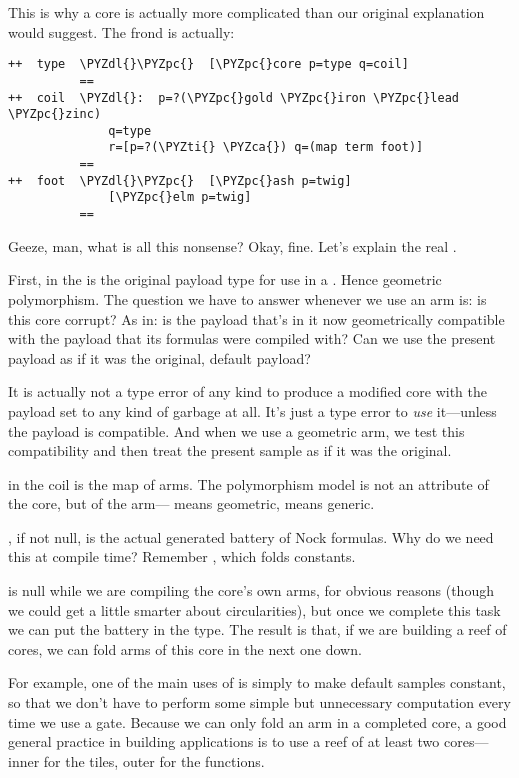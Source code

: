 This is why a core is actually more complicated than our original
explanation would suggest.  The  frond is actually:

\begin{framed_shaded}
\begin{Verbatim}[fontsize=\relsize{-2.5},fontseries=b,commandchars=\\\{\}]
++  type  \PYZdl{}\PYZpc{}  [\PYZpc{}core p=type q=coil]
          ==
++  coil  \PYZdl{}:  p=?(\PYZpc{}gold \PYZpc{}iron \PYZpc{}lead \PYZpc{}zinc)
              q=type
              r=[p=?(\PYZti{} \PYZca{}) q=(map term foot)]
          ==
++  foot  \PYZdl{}\PYZpc{}  [\PYZpc{}ash p=twig]
              [\PYZpc{}elm p=twig]
          ==
\end{Verbatim}
\end{framed_shaded}
Geeze, man, what is all this nonsense?  Okay, fine.  Let's
explain the real .

First,  in the  is the original payload type for use in
a .  Hence geometric polymorphism.  The question we have
to answer whenever we use an arm is: is this core corrupt?  As
in: is the payload that's in it now geometrically compatible with
the payload that its formulas were compiled with?  Can we use the
present payload as if it was the original, default payload?

It is actually not a type error of any kind to produce a modified
core with the payload set to any kind of garbage at all.  It's
just a type error to \emph{use} it---unless the payload is compatible.
And when we use a geometric arm, we test this compatibility and
then treat the present sample as if it was the original.

 in the coil is the map of arms.  The polymorphism model is
not an attribute of the core, but of the arm--- means
geometric,  means generic.  

, if not null, is the actual generated battery of Nock
formulas.  Why do we need this at compile time?  Remember
, which folds constants.  

 is null while we are compiling the core's own arms, for
obvious reasons (though we could get a little smarter about
circularities), but once we complete this task we can put the
battery in the type.  The result is that, if we are building a
reef of cores, we can fold arms of this core in the next one
down.  

For example, one of the main uses of  is simply to make
default samples constant, so that we don't have to perform some
simple but unnecessary computation every time we use a gate.
Because we can only fold an arm in a completed core, a good
general practice in building applications is to use a reef of at
least two cores---inner for the tiles, outer for the functions.

